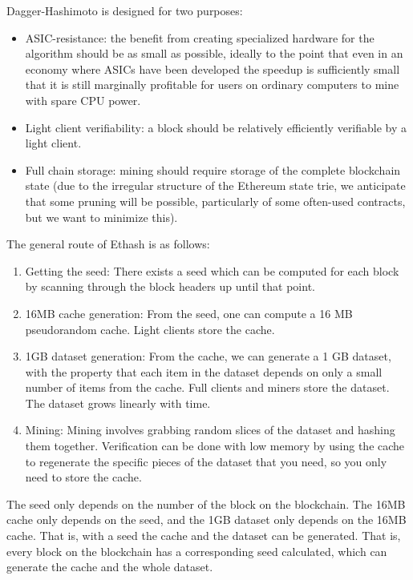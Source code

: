 \documentclass[11pt]{article}
\begin{document}
Dagger-Hashimoto is designed for two purposes:

\begin{itemize}
\item ASIC-resistance: the benefit from creating specialized hardware for the algorithm should be as small as possible, ideally to the point that even in an economy where ASICs have been developed the speedup is sufficiently small that it is still marginally profitable for users on ordinary computers to mine with spare CPU power.
\item Light client verifiability: a block should be relatively efficiently verifiable by a light client.
\item Full chain storage: mining should require storage of the complete blockchain state (due to the irregular structure of the Ethereum state trie, we anticipate that some pruning will be possible, particularly of some often-used contracts, but we want to minimize this).
\end{itemize}

The general route of Ethash is as follows:

\begin{enumerate}
\item Getting the seed: There exists a seed which can be computed for each block by scanning through the block headers up until that point.
\item 16MB cache generation: From the seed, one can compute a 16 MB pseudorandom cache. Light clients store the cache.
\item 1GB dataset generation: From the cache, we can generate a 1 GB dataset, with the property that each item in the dataset depends on only a small number of items from the cache. Full clients and miners store the dataset. The dataset grows linearly with time.
\item Mining: Mining involves grabbing random slices of the dataset and hashing them together. Verification can be done with low memory by using the cache to regenerate the specific pieces of the dataset that you need, so you only need to store the cache.
\end{enumerate}

The seed only depends on the number of the block on the blockchain. The 16MB cache only depends on the seed, and the 1GB dataset only depends on the 16MB cache. That is, with a seed the cache and the dataset can be generated. That is, every block on the blockchain has a corresponding seed calculated, which can generate the cache and the whole dataset.
\end{document}
